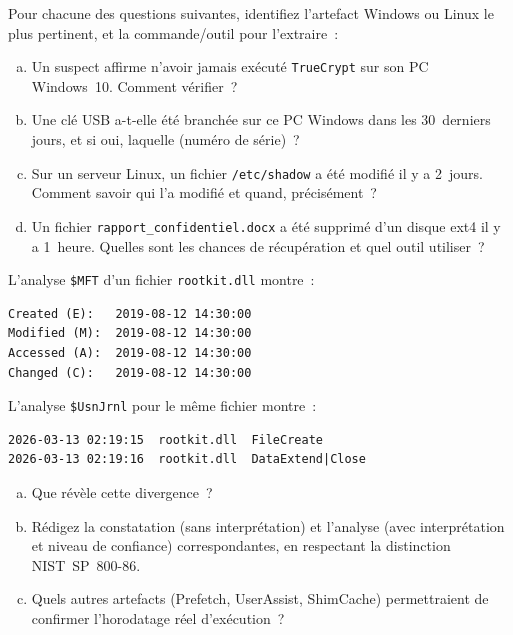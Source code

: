 \begin{boxexo}[title={\ding{45}\quad Exercice~14.1. Identification d'artefacts \niveaubase}]
Pour chacune des questions suivantes, identifiez l'artefact Windows
ou Linux le plus pertinent, et la commande/outil pour l'extraire~:
\begin{enumerate}[(a)]
    \item Un suspect affirme n'avoir jamais exécuté \texttt{TrueCrypt}
          sur son PC Windows~10. Comment vérifier~?
    \item Une clé USB a-t-elle été branchée sur ce PC Windows dans les
          30~derniers jours, et si oui, laquelle (numéro de série)~?
    \item Sur un serveur Linux, un fichier \texttt{/etc/shadow} a été
          modifié il y a 2~jours. Comment savoir qui l'a modifié et quand,
          précisément~?
    \item Un fichier \texttt{rapport\_confidentiel.docx} a été supprimé
          d'un disque ext4 il y a 1~heure. Quelles sont les chances de
          récupération et quel outil utiliser~?
\end{enumerate}
\end{boxexo}

\begin{boxexo}[title={\ding{45}\quad Exercice~14.2. Détection de timestomping \niveaumoyen}]
L'analyse \texttt{\$MFT} d'un fichier \texttt{rootkit.dll} montre~:
\begin{lstlisting}[language=bash_forensique]
Created (E):   2019-08-12 14:30:00
Modified (M):  2019-08-12 14:30:00
Accessed (A):  2019-08-12 14:30:00
Changed (C):   2019-08-12 14:30:00
\end{lstlisting}
L'analyse \texttt{\$UsnJrnl} pour le même fichier montre~:
\begin{lstlisting}[language=bash_forensique]
2026-03-13 02:19:15  rootkit.dll  FileCreate
2026-03-13 02:19:16  rootkit.dll  DataExtend|Close
\end{lstlisting}
\begin{enumerate}[(a)]
    \item Que révèle cette divergence~?
    \item Rédigez la constatation (sans interprétation) et l'analyse
          (avec interprétation et niveau de confiance) correspondantes,
          en respectant la distinction NIST~SP~800-86.
    \item Quels autres artefacts (Prefetch, UserAssist, ShimCache)
          permettraient de confirmer l'horodatage réel d'exécution~?
\end{enumerate}
\end{boxexo}

